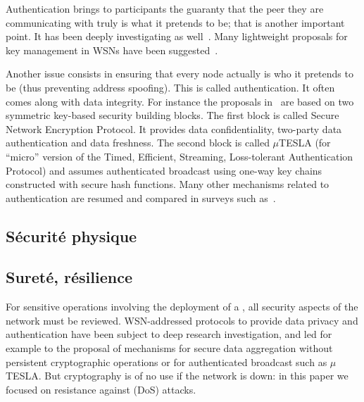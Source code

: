 Authentication brings to participants the guaranty that the peer they are communicating with truly is what it pretends to be; that is another important point.
It has been deeply investigating as well~\cite{GWZC13}.
Many lightweight proposals for key management in WSNs have been suggested~\cite{GWZCK13,BSK13}.



Another issue consists in ensuring that every node actually is who it pretends to be (thus preventing address spoofing).
This is called authentication.
It often comes along with data integrity.
For instance the proposals in~\cite{PSWCT02} are based on two symmetric key-based security building blocks.
The first block is called Secure Network Encryption Protocol.
It provides data confidentiality, two-party data authentication and data freshness.
The second block is called $\mu$TESLA (for ``micro'' version of the Timed, Efficient, Streaming, Loss-tolerant Authentication Protocol) and assumes authenticated broadcast using one-way key chains constructed with secure hash functions.
Many other mechanisms related to authentication are resumed and compared in surveys such as~\cite{SOBMCN11}.

\subsection{Sécurité physique}

\subsection{Sureté, résilience}






For sensitive operations involving the deployment of a \wsn, all security aspects of the network must be reviewed.
WSN-addressed protocols to provide data privacy\cite{OX09} and authentication\cite{SOBMCN11} have been subject to deep research investigation, and led for example to the proposal of mechanisms for secure data aggregation without persistent cryptographic operations\cite{WDSX07} or for authenticated broadcast such as $\mu$TESLA\cite{PSWCT02}.
But cryptography is of no use if the network is down: in this paper we focused on resistance against \dos (DoS) attacks.
